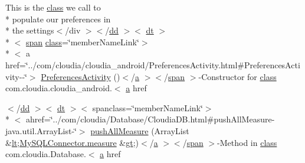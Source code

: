 \begin{DoxyCompactItemize}
 This is the \hyperlink{_tools_8html_acf06f836132665ba8114f5a414c2403f}{class} we call to \\*
populate our preferences in \\*
the settings$<$/div $>$$<$/\hyperlink{stylesheet_8css_a47f4718a86835a7771ec592ece845221}{dd} $>$$<$ \hyperlink{stylesheet_8css_a107565fb4039d33b041380d6e0ea1d80}{dt} $>$\\*
$<$ \hyperlink{stylesheet_8css_a8343996ebcf16220b04e54659aac31cc}{span} \hyperlink{_tools_8html_acf06f836132665ba8114f5a414c2403f}{class}=\char`\"{}member\-Name\-Link\char`\"{}$>$\\*
$<$ a href=\char`\"{}../com/cloudia/cloudia\-\_\-android/Preferences\-Activity.\-html\#Preferences\-Activity-\/-\/\char`\"{}$>$ \hyperlink{index-14_8html_a87fe2d0e4d1a167d9d9720a4f81e157c}{Preferences\-Activity} ()$<$/\hyperlink{style_8css_a5e8981582017bb8b84c21f148345d1f7}{a} $>$$<$/\hyperlink{stylesheet_8css_a8343996ebcf16220b04e54659aac31cc}{span} $>$-\/Constructor for \hyperlink{_tools_8html_acf06f836132665ba8114f5a414c2403f}{class} com.\-cloudia.\-cloudia\-\_\-android.$<$ \hyperlink{style_8css_a5e8981582017bb8b84c21f148345d1f7}{a} href
\item 
$<$/\hyperlink{stylesheet_8css_a47f4718a86835a7771ec592ece845221}{dd} $>$$<$ \hyperlink{stylesheet_8css_a107565fb4039d33b041380d6e0ea1d80}{dt} $>$$<$ spanclass=\char`\"{}member\-Name\-Link\char`\"{}$>$\\*
$<$ ahref=\char`\"{}../com/cloudia/Database/Cloudia\-D\-B.\-html\#push\-All\-Measure-\/java.\-util.\-Array\-List-\/\char`\"{}$>$ \hyperlink{index-14_8html_aa62828c6f0c1f2e17114695cdeb9bfee}{push\-All\-Measure} (Array\-List \&\hyperlink{overview-tree_8html_aac3322e12d911341c3d470b46b2d80f4}{lt};\hyperlink{index-11_8html_acafc813e7e06597a079f86f5cdd7d5f9}{My\-S\-Q\-L\-Connector.\-measure} \&\hyperlink{overview-tree_8html_a1bb4447113f0bd7bf49e2b3dee2e065d}{gt};)$<$/\hyperlink{style_8css_a5e8981582017bb8b84c21f148345d1f7}{a} $>$$<$/\hyperlink{stylesheet_8css_a8343996ebcf16220b04e54659aac31cc}{span} $>$-\/Method in \hyperlink{_tools_8html_acf06f836132665ba8114f5a414c2403f}{class} com.\-cloudia.\-Database.$<$ \hyperlink{style_8css_a5e8981582017bb8b84c21f148345d1f7}{a} href
\end{DoxyCompactItemize}
